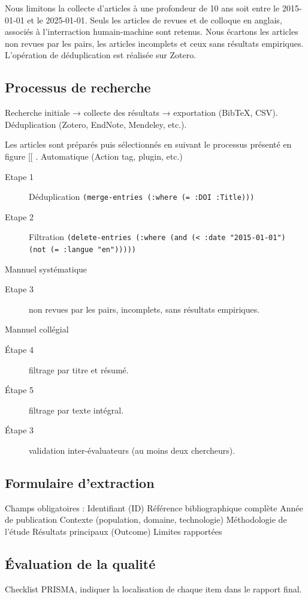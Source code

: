 \documentclass[11pt]{article}
\begin{document}
Nous limitons la collecte d'articles à une profondeur de 10 ans soit entre le 2015-01-01 et le 2025-01-01. Seuls les articles de revues et de colloque en anglais, associés à l'interraction humain-machine sont retenus.
Nous écartons les articles non revues par les pairs, les articles incomplets et ceux sans résultats empiriques.
L'opération de déduplication est réalisée sur Zotero.
\subsection{Processus de recherche}
\label{sec:org896f22c}
Recherche initiale → collecte des résultats → exportation (BibTeX, CSV).
Déduplication (Zotero, EndNote, Mendeley, etc.).

Les articles sont préparés puis sélectionnés en suivant le processus présenté en figure [[ .
Automatique (Action tag, plugin, etc.)
\begin{description}
\item[{Etape 1}] Déduplication \texttt{(merge-entries (:where (= :DOI :Title)))}
\item[{Etape 2}] Filtration \texttt{(delete-entries (:where (and (< :date "2015-01-01") (not (= :langue "en")))))}
\end{description}

Mannuel systématique
\begin{description}
\item[{Etape 3}] non revues par les pairs, incomplets, sans résultats empiriques.
\end{description}

Mannuel collégial
\begin{description}
\item[{Étape 4}] filtrage par titre et résumé.
\item[{Étape 5}] filtrage par texte intégral.
\item[{Étape 3}] validation inter-évaluateurs (au moins deux chercheurs).
\end{description}
\subsection{Formulaire d’extraction}
\label{sec:org0df211d}
Champs obligatoires :
    Identifiant (ID)
    Référence bibliographique complète
    Année de publication
    Contexte (population, domaine, technologie)
    Méthodologie de l’étude
    Résultats principaux (Outcome)
    Limites rapportées
\subsection{Évaluation de la qualité}
\label{sec:org1f1546c}
Checklist PRISMA, indiquer la localisation de chaque item dans le rapport final.
\end{document}
